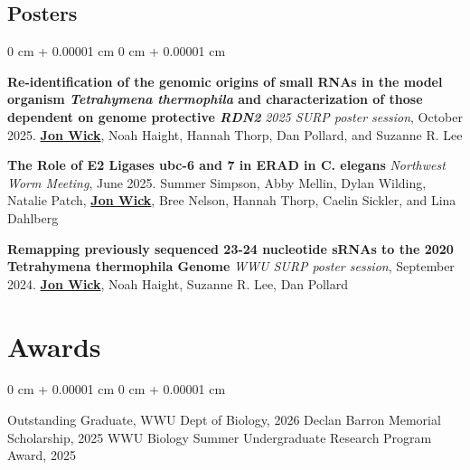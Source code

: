 \documentclass[10pt, article]{article}
\newenvironment{onecolentry}{
    \begin{adjustwidth}{
        0 cm + 0.00001 cm
    }{
        0 cm + 0.00001 cm
    }
}{
    \end{adjustwidth}
} %
\begin{document}
\begin{samepage}

\section{Posters}





\begin{onecolentry}
	\textbf{Re-identification of the genomic origins of small RNAs in the model organism \textit{Tetrahymena thermophila} and characterization of those dependent on genome protective \textit{RDN2}} \newline
	\textit{2025 SURP poster session}, October 2025.\newline
	\underline{\textbf{Jon Wick}}, Noah Haight, Hannah Thorp, Dan Pollard, and Suzanne R. Lee

	\vspace{0.2cm}

	\textbf{The Role of E2 Ligases ubc-6 and 7 in ERAD in C. elegans} \newline
	\textit{Northwest Worm Meeting}, June 2025.\newline
	Summer Simpson, Abby Mellin, Dylan Wilding, Natalie Patch, \underline{\textbf{Jon Wick}}, Bree Nelson, Hannah Thorp, Caelin Sickler, and Lina Dahlberg

	\vspace{0.2cm}

	\textbf{Remapping previously sequenced 23-24 nucleotide sRNAs to the 2020 Tetrahymena thermophila Genome}\newline
	\textit{WWU SURP poster session}, September 2024. \newline
	\underline{\textbf{Jon Wick}}, Noah Haight, Suzanne R. Lee, Dan Pollard

\end{onecolentry}
\end{samepage}

\section{Awards}
\begin{onecolentry}
	Outstanding Graduate, WWU Dept of Biology, 2026 \textbar{} Declan Barron Memorial Scholarship, 2025 \textbar{} WWU Biology Summer Undergraduate Research Program Award, 2025
\end{onecolentry}
\end{document}
